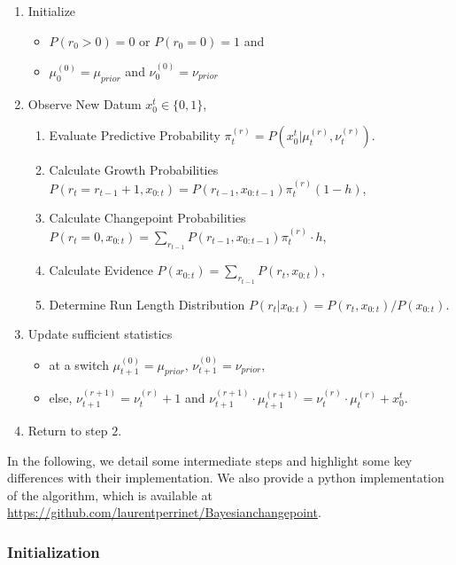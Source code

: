 \documentclass[10pt,letterpaper]{article}
\newcommand{\eqa}[1]{\begin{align}#1\end{align}}
\begin{document}
\begin{enumerate}
	\item Initialize
	\begin{itemize}
		\item    $P(r_0>0)= 0$ or $P(r_0=0)=1$ and
		\item    $\mu^{(0)}_0 = \mu_{prior}$ and $\nu^{(0)}_0 = \nu_{prior}$
	\end{itemize}

	\item     Observe New Datum $x_0^t \in \{ 0, 1 \}$,

	\begin{enumerate}

		\item    Evaluate Predictive Probability $\pi^{(r)}_{t} = P(x_0^t |\mu^{(r)}_t,\nu^{(r)}_t)$.
	    \item    Calculate Growth Probabilities $P(r_t=r_{t-1}+1, x_{0:t}) = P(r_{t-1}, x_{0:t-1}) \pi^{(r)}_t (1-h)$,
	    \item    Calculate Changepoint Probabilities $P(r_t=0, x_{0:t})= \sum_{r_{t-1}} P(r_{t-1}, x_{0:t-1}) \pi^{(r)}_t \cdot h$,
	    \item    Calculate Evidence $P(x_{0:t}) = \sum_{r_{t-1}} P (r_t, x_{0:t})$,
	    \item    Determine Run Length Distribution $P (r_t | x_{0:t}) = P (r_t, x_{0:t})/P (x_{0:t}) $.
	\end{enumerate}

	\item     Update sufficient statistics
		\begin{itemize}
			\item  at a switch  $\mu^{(0)}_{t+1} = \mu_{prior}$, $\nu^{(0)}_{t+1} = \nu_{prior}$,
			\item  else, $\nu^{(r+1)}_{t+1} = \nu^{(r)}_{t} + 1$ and $\nu^{(r+1)}_{t+1} \cdot \mu^{(r+1)}_{t+1} = \nu^{(r)}_{t} \cdot \mu^{(r)}_{t} + x_0^t$.
		\end{itemize}
	\item     Return to step $2$.
\end{enumerate}


In the following, we  detail some intermediate steps and highlight some key differences with their implementation. We also provide a python implementation of the algorithm, which is available at \url{https://github.com/laurentperrinet/Bayesianchangepoint}.

\subsubsection{Initialization}
\end{document}

